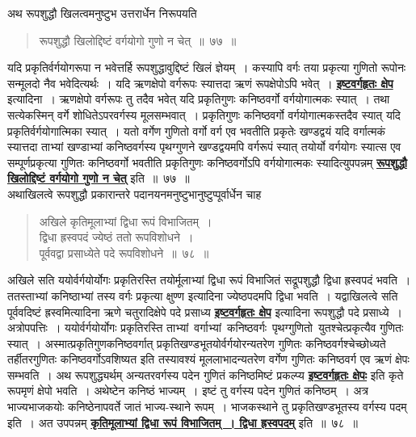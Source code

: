 \documentclass[11pt, openany]{book}
\begin{document}
\newpage
 अथ रूपशुद्धौ खिलत्वमनुष्टुभ उत्तरार्धेन निरूपयति\textendash
 
 \label{77}
\begin{quote}
    \ab 
    रूपशुद्धौ खिलोद्दिष्टं वर्गयोगो गुणो न चेत्~॥~७७~॥~
\end{quote}
 
 यदि प्रकृतिर्वर्गयोगरूपा न भवेत्तर्हि रूपशुद्धावुद्दिष्टं खिलं ज्ञेयम्~। कस्यापि वर्गः तया प्रकृत्या गुणितो रूपोनः सन्मूलदो नैव भवेदित्यर्थः~। यदि ऋणक्षेपो वर्गरूपः स्यात्तदा ऋणं रूपक्षेपोऽपि भवेत्~। \hyperref[72]{\textbf{इष्टवर्गहृतः क्षेप}} इत्यादिना~। ऋणक्षेपो वर्गरूपः तु तदैव भवेत् यदि प्रकृतिगुणः कनिष्ठवर्गो वर्गयोगात्मकः स्यात्~। तथा सत्येकस्मिन् वर्गे शोधितेऽपरवर्गस्य मूलसम्भवात्~। प्रकृतिगुणः कनिष्ठवर्गो
वर्गयोगात्मकस्तदैव स्यात् यदि प्रकृतिर्वर्गयोगात्मिका स्यात्~। यतो वर्गेण गुणितो
वर्गो वर्ग एव भवतीति प्रकृतेः खण्डद्वयं यदि वर्गात्मकं स्यात्तदा ताभ्यां
खण्डाभ्यां कनिष्ठवर्गस्य पृथग्गुणने खण्डद्वयमपि वर्गरूपं स्यात् तयोर्यो वर्गयोगः
स्यात्स एव सम्पूर्णप्रकृत्या गुणितः कनिष्ठवर्गो भवतीति प्रकृतिगुणः कनिष्ठवर्गोऽपि
वर्गयोगात्मकः स्यादित्युपपन्नम् \hyperref[77]{\textbf{रूपशुद्धौ खिलोद्दिष्टं वर्गयोगो गुणो न चेत्}} इति~॥~७७~॥\\

\vspace{-2mm}
 अथाखिलत्वे रूपशुद्धौ प्रकारान्तरे पदानयनमनुष्टुभानुष्टुप्पूर्वार्धेन चाह\textendash

 \label{78}
\begin{quote}
    \ab 
     अखिले कृतिमूलाभ्यां द्विधा रूपं विभाजितम्~। \\
 द्विधा ह्रस्वपदं ज्येष्ठं ततो रूपविशोधने~। \\
 पूर्ववद्वा प्रसाध्येते पदे रूपविशोधने~॥~७८~॥~
\end{quote}
 
 अखिले सति ययोर्वर्गयोर्योगः प्रकृतिरस्ति तयोर्मूलाभ्यां द्विधा रूपं
विभाजितं सद्रूपशुद्धौ द्विधा ह्रस्वपदं भवति~। ततस्ताभ्यां कनिष्ठाभ्यां तस्य
वर्गः प्रकृत्या क्षुण्ण इत्यादिना ज्येष्ठपदमपि द्विधा भवति~। यद्वाखिलत्वे सति
पूर्ववदिष्टं ह्रस्वमित्यादिना ऋणे चतुरादिक्षेपे पदे प्रसाध्य \hyperref[72]{\textbf{इष्टवर्गहृतः क्षेप}} इत्यादिना 
रूपशुद्धौ पदे प्रसाध्ये~। अत्रोपपत्तिः~। ययोर्वर्गयोर्योगः प्रकृतिरस्ति
ताभ्यां \,वर्गाभ्यां \,कनिष्ठवर्गः \,पृथग्गुणितो \,युतश्चेत्प्रकृत्यैव गुणितः स्यात्~।
अस्मात्प्रकृतिगुणकनिष्ठवर्गात् 
प्रकृतिखण्डभूतयोर्वर्गयोरन्यतरेण गुणितः कनिष्ठवर्गश्चेच्छोध्यते
तर्हीतरगुणितः 
कनिष्ठवर्गोऽवशिष्यत इति तस्यावश्यं मूललाभादन्यतरेण वर्गेण गुणितः
कनिष्ठवर्ग
 \newpage%
\noindent एव ऋणं क्षेपः सम्भवति~। अथ रूपशुद्ध्यर्थम् अन्यतरवर्गस्य पदेन गुणितं
कनिष्ठमिष्टं प्रकल्प्य \hyperref[72]{\textbf{इष्टवर्गहृतः क्षेपः}} इति कृते रूपमृणं क्षेपो भवति~। अथेष्टेन कनिष्ठं भाज्यम्~। इष्टं तु वर्गस्य पदेन गुणितं कनिष्ठम्~। अत्र भाज्यभाजकयोः कनिष्ठेनापवर्ते जातं भाज्य-स्थाने रूपम्~। भाजकस्थाने तु प्रकृतिखण्डभूतस्य वर्गस्य पदम् इति~। अत उपपन्नम् \hyperref[78]{\textbf{कृतिमूलाभ्यां द्विधा रूपं विभाजितम्~। द्विधा ह्रस्वपदम्}} इति~॥~७८~॥~\\
\end{document}
